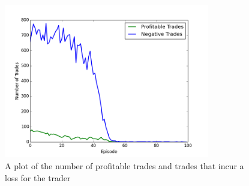\documentclass[ %
                    author={Ashwinder Khurana},
                supervisor={Prof Dave Cliff},
                    degree={MEng},
                     title={The Deeply Reinforced Trader},
                  subtitle={},
                      type={enterprise},
                      year={2020} ]{dissertation}
\begin{document}
{\begin{figure}[H] 
	\centering
  	\includegraphics[width=0.8\textwidth]{PG-Vanilla-Good-Vs-Bad-Trades.png}
  	\caption{A plot of the number of profitable trades and trades that incur a loss for the trader }
	\label{fig:PG-Vanilla-Good-Vs-Bad}  
\end{figure}

}
\end{document}
